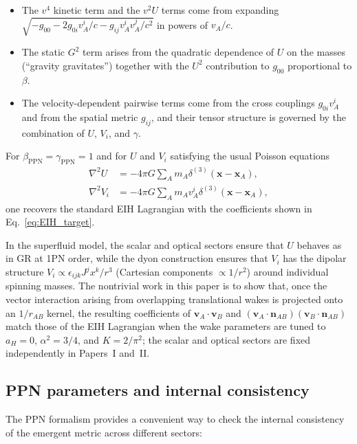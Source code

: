 \documentclass[11pt]{article}
\begin{document}
\begin{itemize}
  \item The $v^4$ kinetic term and the $v^2 U$ terms come from
        expanding $\sqrt{-g_{00} - 2 g_{0i} v_A^i/c - g_{ij}
        v_A^i v_A^j/c^2}$ in powers of $v_A/c$.
  \item The static $G^2$ term arises from the quadratic dependence
        of $U$ on the masses (``gravity gravitates'') together with
        the $U^2$ contribution to $g_{00}$ proportional to $\beta$.
  \item The velocity-dependent pairwise terms come from the cross
        couplings $g_{0i} v_A^i$ and from the spatial metric
        $g_{ij}$, and their tensor structure is governed by the
        combination of $U$, $V_i$, and $\gamma$.
\end{itemize}

For $\beta_{\mathrm{PPN}}=\gamma_{\mathrm{PPN}}=1$ and for $U$ and
$V_i$ satisfying the usual
Poisson equations
\begin{align}
  \nabla^2 U &= -4\pi G \sum_A m_A \delta^{(3)}(\mathbf{x}-\mathbf{x}_A),
  \\
  \nabla^2 V_i &= -4\pi G \sum_A m_A v_A^i
                     \delta^{(3)}(\mathbf{x}-\mathbf{x}_A),
\end{align}
one recovers the standard EIH Lagrangian with the coefficients shown
in Eq.~\eqref{eq:EIH_target}.

In the superfluid model, the scalar and optical sectors ensure that
$U$ behaves as in GR at 1PN order, while the dyon construction
ensures that $V_i$ has the dipolar structure
$V_i\propto \epsilon_{ijk}J^j x^k/r^3$ (Cartesian components $\propto 1/r^2$) around
individual spinning masses.
The nontrivial work in this paper is to show that, once the vector
interaction arising from overlapping translational wakes is projected onto an
$1/r_{AB}$ kernel, the resulting coefficients of
$\mathbf{v}_A\cdot\mathbf{v}_B$ and
$(\mathbf{v}_A\cdot\mathbf{n}_{AB})(\mathbf{v}_B\cdot\mathbf{n}_{AB})$
match those of the EIH Lagrangian when the wake parameters are tuned to
$a_H=0$, $\alpha^2=3/4$, and $K=2/\pi^2$; the scalar and optical sectors are
fixed independently in Papers~I and~II.

\subsection{PPN parameters and internal consistency}

The PPN formalism provides a convenient way to check the internal
consistency of the emergent metric across different sectors:
\end{document}

